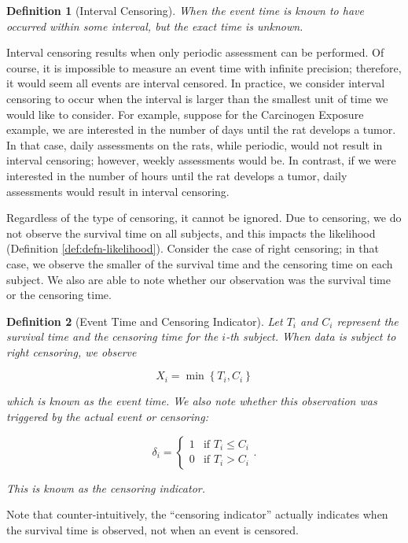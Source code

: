 \documentclass[
]{book}
\theoremstyle{plain}
\theoremstyle{mydefn}
\newtheorem{definition}{Definition}[chapter]
\theoremstyle{myexmpl}
\theoremstyle{remark}
\begin{document}
\begin{definition}[Interval Censoring]
When the event time is known to have occurred within some interval, but the exact time is unknown.
\end{definition}

Interval censoring results when only periodic assessment can be performed. Of course, it is impossible to measure an event time with infinite precision; therefore, it would seem all events are interval censored. In practice, we consider interval censoring to occur when the interval is larger than the smallest unit of time we would like to consider. For example, suppose for the Carcinogen Exposure example, we are interested in the number of days until the rat develops a tumor. In that case, daily assessments on the rats, while periodic, would not result in interval censoring; however, weekly assessments would be. In contrast, if we were interested in the number of hours until the rat develops a tumor, daily assessments would result in interval censoring.

Regardless of the type of censoring, it cannot be ignored. Due to censoring, we do not observe the survival time on all subjects, and this impacts the likelihood (Definition \ref{def:defn-likelihood}). Consider the case of right censoring; in that case, we observe the smaller of the survival time and the censoring time on each subject. We also are able to note whether our observation was the survival time or the censoring time.

\begin{definition}[Event Time and Censoring Indicator]
Let \(T_i\) and \(C_i\) represent the survival time and the censoring time for the \(i\)-th subject. When data is subject to right censoring, we observe

\[X_i = \min\left\{T_i, C_i\right\}\]

which is known as the \emph{event} time. We also note whether this observation was triggered by the actual event or censoring:

\[\delta_i = \begin{cases} 1 & \text{if } T_i \leq C_i \\ 0 & \text{if } T_i > C_i \end{cases}.\]

This is known as the \emph{censoring indicator}.
\end{definition}

\begin{rmdwarning}
Note that counter-intuitively, the ``censoring indicator'' actually indicates when the survival time is observed, not when an event is censored.
\end{rmdwarning}
\end{document}
